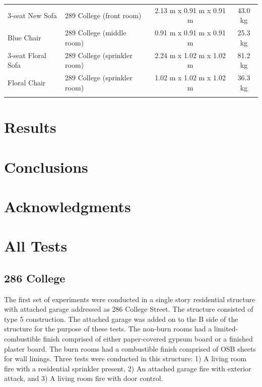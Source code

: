 \documentclass[12pt,oneside]{book}
\begin{document}
\begin{table}
\begin{tabular}{llcc}
3-seat New Sofa              &  289 College (front room)         &  2.13 m x 0.91 m x 0.91 m  &  43.0 kg    \\
Blue Chair                   &  289 College (middle room)        &  0.91 m x 0.91 m x 0.91 m  &  25.3 kg    \\
3-seat Floral Sofa           &  289 College (sprinkler room)     &  2.24 m x 1.02 m x 1.02 m  &  81.2 kg    \\
Floral Chair                 &  289 College (sprinkler room)     &  1.02 m x 1.02 m x 1.02 m  &  36.3 kg    \\
\noalign{\smallskip}\hline
\end{tabular}
\label{tab:Fuel_Masses}
\end{table}

\chapter{Results}
\label{chap:Results}


\clearpage


\chapter{Conclusions}
\label{chap:Conclusions}

\chapter{Acknowledgments}
\label{chap:Acknowledgments}



\appendix

\chapter{All Tests}

\section{286 College}

The first set of experiments were conducted in a single story residential structure with attached garage addressed as 286 College Street.  The structure consisted of type 5 construction. The attached garage was added on to the B side of the structure for the purpose of these tests.  The non-burn rooms had a limited-combustible finish comprised of either paper-covered gypsum board or a finished plaster board.  The burn rooms had a combustible finish comprised of OSB sheets for wall linings.  Three tests were conducted in this structure: 1) A living room fire with a residential sprinkler present, 2) An attached garage fire with exterior attack, and 3) A living room fire with door control.
\end{document}
